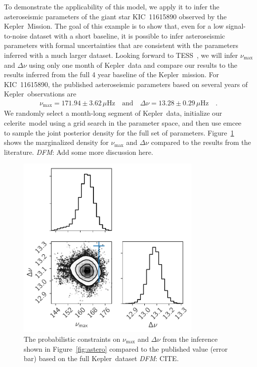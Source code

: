 \documentclass[manuscript, letterpaper]{aastex6}
\newcommand{\project}[1]{\textsf{#1}}
\newcommand{\kepler}{\project{Kepler}}
\newcommand{\tess}{\project{TESS}}
\newcommand{\celerite}{\project{celerite}}
\newcommand{\emcee}{\project{emcee}}
\newcommand{\figureref}[1]{\ref{fig:#1}}
\newcommand{\Figure}[1]{Figure~\figureref{#1}}
\newcommand{\figurelabel}[1]{\label{fig:#1}}
\newcommand{\todo}[3]{{\color{#2}\emph{#1}: #3}}
\newcommand{\dfmtodo}[1]{\todo{DFM}{red}{#1}}
\begin{document}
To demonstrate the applicability of this model, we apply it to infer the
asteroseismic parameters of the giant star KIC~11615890 observed by the
\kepler\ Mission.
The goal of this example is to show that, even for a low signal-to-noise
dataset with a short baseline, it is possible to infer asteroseismic
parameters with formal uncertainties that are consistent with the parameters
inferred with a much larger dataset.
Looking forward to \tess\ \citep{Campante:2016}, we will infer
$\nu_\mathrm{max}$ and $\Delta\nu$ using only one month of \kepler\ data and
compare our results to the results inferred from the full 4 year baseline of
the \kepler\ mission.
For KIC~11615890, the published asteroseismic parameters based on several
years of \kepler\ observations are \citep{Pinsonneault:2014}
\begin{eqnarray}
    \nu_\mathrm{max} = 171.94 \pm 3.62 \,\mu\mathrm{Hz} \quad\mathrm{and}\quad
    \Delta\nu = 13.28 \pm 0.29 \,\mu\mathrm{Hz} \quad.
\end{eqnarray}
We randomly select a month-long segment of \kepler\ data, initialize our
\celerite\ model using a grid search in the parameter space, and then use
\emcee\ \citep{Foreman-Mackey:2013} to sample the joint posterior density for
the full set of parameters.
\Figure{astero-corner} shows the marginalized density for $\nu_\mathrm{max}$
and $\Delta\nu$ compared to the results from the literature.
\dfmtodo{Add some more discussion here.}

\begin{figure}[!htbp]
\begin{center}
\includegraphics[width=0.8\textwidth]{figures/astero-11615890-numax_deltanu_corner.pdf}
\caption{The probabilistic constraints on $\nu_\mathrm{max}$ and $\Delta \nu$
    from the inference shown in \Figure{astero} compared to the published
    value (error bar) based on the full \kepler\ dataset \dfmtodo{CITE}.
    \figurelabel{astero-corner}}
\end{center}
\end{figure}
\end{document}
